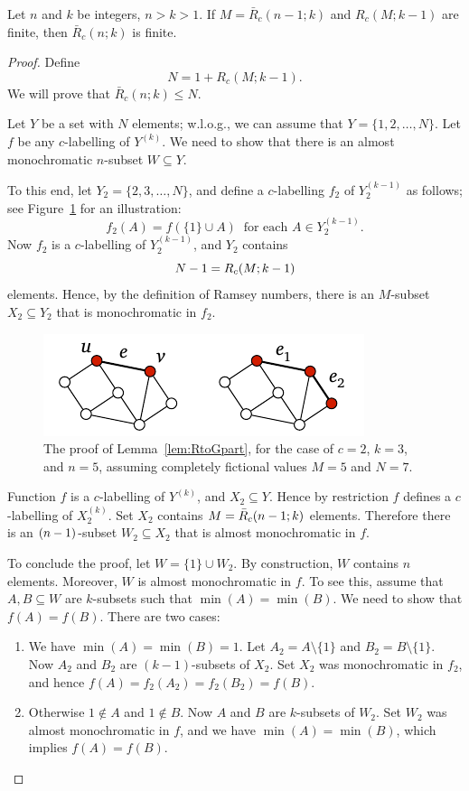 \begin{lemma}\label{lem:RtoGpart}
    Let $n$ and $k$ be integers, $n > k > 1$.
    If $M = \bar{R}_c(n-1;k)$ and $R_c(M;k-1)$ are finite, then $\bar{R}_c(n;k)$ is finite.
\end{lemma}
\begin{proof}
    Define
    \[
        N = 1 + R_c(M;k-1).
    \]
    We will prove that $\bar{R}_c(n;k) \le N$.
    
    Let $Y$ be a set with $N$ elements; w.l.o.g., we can assume that $Y = \{1,2,\dotsc,N\}$. Let $f$ be any $c$-labelling of $Y^{(k)}$. We need to show that there is an almost monochromatic $n$-subset $W \subseteq Y$.
    
    To this end, let $Y_2 = \{2,3,\dotsc,N\}$, and define a $c$-labelling $f_2$ of $Y_2^{(k-1)}$ as follows; see Figure~\ref{fig:RtoGpart} for an illustration:
    \[
        f_2(A) = f(\{1\} \cup A) \ \text{ for each } A \in Y_2^{(k-1)}.
    \]
    Now $f_2$ is a $c$-labelling of $Y_2^{(k-1)}$, and $Y_2$ contains
    \[
        N - 1 = R_c(M;k-\nobreak 1)
    \]    
    elements. Hence, by the definition of Ramsey numbers, there is an $M$-subset $X_2 \subseteq Y_2$ that is monochromatic in $f_2$.

\begin{figure}
    \centering
    \includegraphics[page=\PRtoGPart]{figs.pdf}
    \caption{The proof of Lemma~\ref{lem:RtoGpart}, for the case of $c = 2$, $k = 3$, and $n = 5$, assuming completely fictional values $M = 5$ and $N = 7$.}\label{fig:RtoGpart}
\end{figure}
    
    Function $f$ is a $c$-labelling of $Y^{(k)}$, and $X_2 \subseteq Y$. Hence by restriction $f$ defines a $c$-labelling of $X_2^{(k)}$. Set $X_2$ contains $M = \bar{R}_c(n-\nobreak 1;k)$ elements. Therefore there is an $(n-\nobreak 1)$-subset $W_2 \subseteq X_2$ that is almost monochromatic in $f$.
    
    To conclude the proof, let $W = \{1\} \cup W_2$. By construction, $W$ contains $n$ elements. Moreover, $W$ is almost monochromatic in $f$. To see this, assume that $A,B \subseteq W$ are $k$-subsets such that $\min(A) = \min(B)$. We need to show that $f(A) = f(B)$. There are two cases:
    \begin{enumerate}
        \item We have $\min(A) = \min(B) = 1$. Let $A_2 = A \setminus \{1\}$ and $B_2 = B \setminus \{1\}$. Now $A_2$ and $B_2$ are $(k-1)$-subsets of $X_2$. Set $X_2$ was monochromatic in $f_2$, and hence $f(A) = f_2(A_2) = f_2(B_2) = f(B)$.
        \item Otherwise $1 \notin A$ and $1 \notin B$. Now $A$ and $B$ are $k$-subsets of $W_2$. Set $W_2$ was almost monochromatic in $f$, and we have $\min(A) = \min(B)$, which implies $f(A) = f(B)$. \qedhere
    \end{enumerate}
\end{proof}

